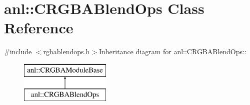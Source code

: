 \hypertarget{classanl_1_1CRGBABlendOps}{
\section{anl::CRGBABlendOps Class Reference}
\label{classanl_1_1CRGBABlendOps}
}


{\ttfamily \#include $<$rgbablendops.h$>$}Inheritance diagram for anl::CRGBABlendOps::\begin{figure}[H]
\begin{center}
\leavevmode
\includegraphics[height=2cm]{classanl_1_1CRGBABlendOps}
\end{center}
\end{figure}

